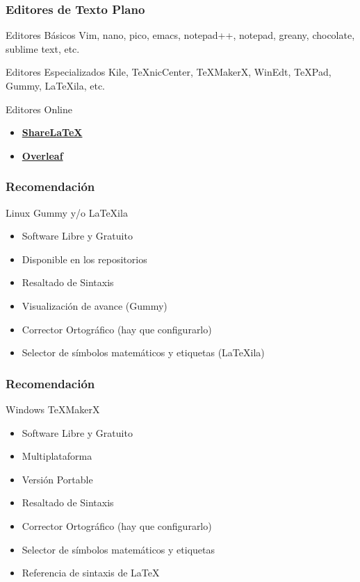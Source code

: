 \documentclass[aspectratio=43]{beamer}%
\begin{document}
\begin{frame}[fragile]
\frametitle{\textbf{Editores de Texto Plano}}
\justifying
 \begin{block}{Editores Básicos}
Vim, nano, pico, emacs, notepad++, notepad, greany, chocolate, sublime text, etc.
\end{block}

\begin{block}{Editores Especializados}
Kile, \TeX{}nicCenter, \TeX{}MakerX, WinEdt, \TeX{}Pad, Gummy, \LaTeX{}ila, etc.
\end{block}


\begin{block}{Editores Online}
\begin{itemize}\justifying
  \item \href{https://www.sharelatex.com?r=3e23a01e&rm=d&rs=b}{\textbf{Share\LaTeX{}}}
  \item \href{https://www.overleaf.com/signup?ref=f53152975118}{\textbf{Overleaf}}
\end{itemize}

\end{block}
\end{frame}

\begin{frame}[fragile]
\frametitle{\textbf{Recomendación}}
\justifying
 \begin{block}{Linux}
Gummy y/o \LaTeX{}ila
\begin{itemize}\justifying
  \item Software Libre y Gratuito
  \item Disponible en los repositorios
  \item Resaltado de Sintaxis
  \item Visualización de avance (Gummy)
  \item Corrector Ortográfico (hay que configurarlo)
  \item Selector de símbolos matemáticos y etiquetas (\LaTeX{}ila)
\end{itemize}
\end{block}
\end{frame}


\begin{frame}[fragile]
\frametitle{\textbf{Recomendación}}
\justifying

\begin{block}{Windows}
\TeX{}MakerX
\begin{itemize}\justifying
  \item Software Libre y Gratuito
  \item Multiplataforma
  \item Versión Portable
  \item Resaltado de Sintaxis
  \item Corrector Ortográfico (hay que configurarlo)
  \item Selector de símbolos matemáticos y etiquetas
  \item Referencia de sintaxis de \LaTeX{}
\end{itemize}

\end{block}
\end{frame}
\end{document}
